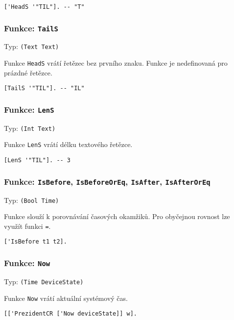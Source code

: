 \begin{lstlisting}[caption={Ukázka využití HeadS}]
['HeadS '"TIL"]. -- "T"
\end{lstlisting}

\subsubsection*{Funkce: \lstinline{TailS}}
Typ: \lstinline{(Text Text)}

Funkce \lstinline{HeadS} vrátí řetězec bez prvního znaku. Funkce je nedefinovaná pro prázdné
řetězce.

\begin{lstlisting}[caption={Ukázka využití TailS}]
[TailS '"TIL"]. -- "IL"
\end{lstlisting}

\subsubsection*{Funkce: \lstinline{LenS}}
Typ: \lstinline{(Int Text)}

Funkce \lstinline{LenS} vrátí délku textového řetězce.

\begin{lstlisting}[caption={Ukázka využití LenS}]
[LenS '"TIL"]. -- 3
\end{lstlisting}

\subsubsection*{Funkce: \lstinline{IsBefore}, \lstinline{IsBeforeOrEq}, \lstinline{IsAfter},
  \lstinline{IsAfterOrEq}}
Typ: \lstinline{(Bool Time)}

Funkce slouží k porovnávání časových okamžiků. Pro obyčejnou rovnost lze využít funkci
\lstinline{=}.

\begin{lstlisting}[caption={Ukázka porovnávání časových okamžiků}]
['IsBefore t1 t2].
\end{lstlisting}

\subsubsection*{Funkce: \lstinline{Now}}
Typ: \lstinline{(Time DeviceState)}

Funkce \lstinline{Now} vrátí aktuální systémový čas.

\begin{lstlisting}[caption={Ukázka využití Now}]
[['PrezidentCR ['Now deviceState]] w].
\end{lstlisting}

